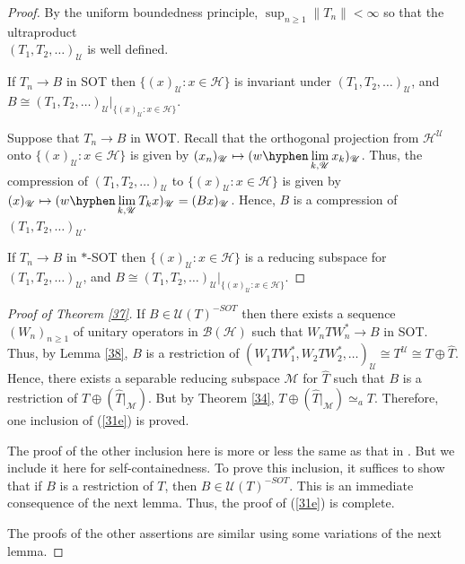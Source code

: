 \documentclass[11pt]{amsart}
\theoremstyle{definition}
\numberwithin{equation}{section}
\begin{document}
\begin{proof}
By the uniform boundedness principle, $\displaystyle\sup_{n\geq 1}\|T_{n}\|<\infty$ so that the ultraproduct\\
$(T_{1},T_{2},\ldots)_{\mathscr{U}}$ is well defined.

If $T_{n}\to B$ in SOT then $\{(x)_{\mathscr{U}}:x\in\mathcal{H}\}$ is invariant under $(T_{1},T_{2},\ldots)_{\mathscr{U}}$, and
$B\cong (T_{1},T_{2},\ldots)_{\mathscr{U}}|_{\{(x)_{\mathscr{U}}:x\in\mathcal{H}\}}$.

Suppose that $T_{n}\to B$ in WOT. Recall that the orthogonal projection from $\mathcal{H}^{\mathscr{U}}$ onto $\{(x)_{\mathscr{U}}:x\in\mathcal{H}\}$ is given by
$\displaystyle (x_{n})_{\mathscr{U}}\mapsto(w\hyphen\lim_{k,\mathscr{U}}x_{k})_{\mathscr{U}}$. Thus, the compression of $(T_{1},T_{2},\ldots)_{\mathscr{U}}$ to
$\{(x)_{\mathscr{U}}:x\in\mathcal{H}\}$ is given by $\displaystyle(x)_{\mathscr{U}}\mapsto (w\hyphen\lim_{k,\mathscr{U}}T_{k}x)_{\mathscr{U}}=(Bx)_{\mathscr{U}}$. Hence,
$B$ is a compression of $(T_{1},T_{2},\ldots)_{\mathscr{U}}$.

If $T_{n}\to B$ in $*$-SOT then $\{(x)_{\mathscr{U}}:x\in\mathcal{H}\}$ is a reducing subspace for $(T_{1},T_{2},\ldots)_{\mathscr{U}}$, and $B\cong (T_{1},T_{2},\ldots)_{
\mathscr{U}}|_{\{(x)_{\mathscr{U}}:x\in\mathcal{H}\}}$.
\end{proof}
\begin{proof}[Proof of Theorem \ref{37}]
If $B\in\mathcal{U}(T)^{-SOT}$ then there exists a sequence $(W_{n})_{n\geq 1}$ of unitary operators in $\mathcal{B(H)}$ such that $W_{n}TW_{n}^{*}\to B$ in SOT.
Thus, by Lemma \ref{38}, $B$ is a restriction of $(W_{1}TW_{1}^{*},W_{2}TW_{2}^{*},\ldots)_{\mathscr{U}}\cong T^{\mathscr{U}}\cong T\oplus\widehat{T}$. Hence, there exists
a separable reducing subspace $\mathcal{M}$ for $\widehat{T}$ such that $B$ is a restriction of $T\oplus(\widehat{T}|_{\mathcal{M}})$. But by Theorem \ref{34},
$T\oplus(\widehat{T}|_{\mathcal{M}})\simeq_{a}T$. Therefore, one inclusion of (\ref{31e}) is proved.

The proof of the other inclusion here is more or less the same as that in \cite{Hadwin2}. But we include it here for self-containedness. To prove this
inclusion, it suffices to show that if $B$ is a restriction of $T$, then $B\in\mathcal{U}(T)^{-SOT}$. This is an immediate consequence of the next lemma. Thus, the proof
of (\ref{31e}) is complete.

The proofs of the other assertions are similar using some variations of the next lemma.
\end{proof}
\end{document}
